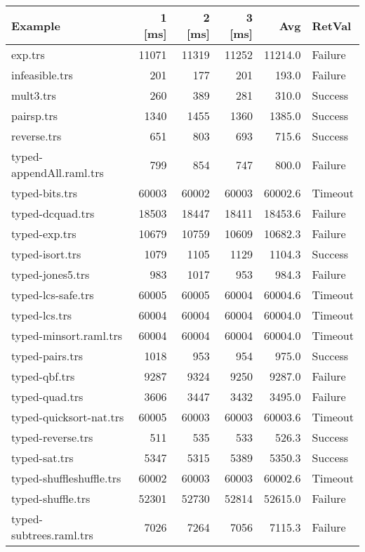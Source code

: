 \documentclass[11pt]{article}
\begin{document}
\begin{center}
\begin{tabular}{lrrrrl}
\hline
Example & 1 [ms] & 2 [ms] & 3 [ms] & Avg & RetVal\\
\hline
exp.trs & 11071 & 11319 & 11252 & 11214.0 & Failure\\
infeasible.trs & 201 & 177 & 201 & 193.0 & Failure\\
mult3.trs & 260 & 389 & 281 & 310.0 & Success\\
pairsp.trs & 1340 & 1455 & 1360 & 1385.0 & Success\\
reverse.trs & 651 & 803 & 693 & 715.6 & Success\\
typed-appendAll.raml.trs & 799 & 854 & 747 & 800.0 & Failure\\
typed-bits.trs & 60003 & 60002 & 60003 & 60002.6 & Timeout\\
typed-dcquad.trs & 18503 & 18447 & 18411 & 18453.6 & Failure\\
typed-exp.trs & 10679 & 10759 & 10609 & 10682.3 & Failure\\
typed-isort.trs & 1079 & 1105 & 1129 & 1104.3 & Success\\
typed-jones5.trs & 983 & 1017 & 953 & 984.3 & Failure\\
typed-lcs-safe.trs & 60005 & 60005 & 60004 & 60004.6 & Timeout\\
typed-lcs.trs & 60004 & 60004 & 60004 & 60004.0 & Timeout\\
typed-minsort.raml.trs & 60004 & 60004 & 60004 & 60004.0 & Timeout\\
typed-pairs.trs & 1018 & 953 & 954 & 975.0 & Success\\
typed-qbf.trs & 9287 & 9324 & 9250 & 9287.0 & Failure\\
typed-quad.trs & 3606 & 3447 & 3432 & 3495.0 & Failure\\
typed-quicksort-nat.trs & 60005 & 60003 & 60003 & 60003.6 & Timeout\\
typed-reverse.trs & 511 & 535 & 533 & 526.3 & Success\\
typed-sat.trs & 5347 & 5315 & 5389 & 5350.3 & Success\\
typed-shuffleshuffle.trs & 60002 & 60003 & 60003 & 60002.6 & Timeout\\
typed-shuffle.trs & 52301 & 52730 & 52814 & 52615.0 & Failure\\
typed-subtrees.raml.trs & 7026 & 7264 & 7056 & 7115.3 & Failure\\
\hline
\end{tabular}

\end{center}
\end{document}
